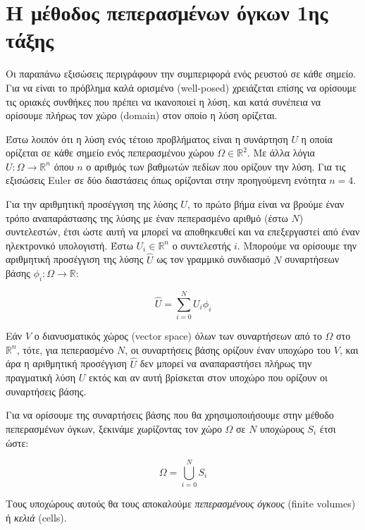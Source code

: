 \section{Η μέθοδος πεπερασμένων όγκων 1ης τάξης}

Οι παραπάνω εξισώσεις περιγράφουν την συμπεριφορά ενός ρευστού σε κάθε σημείο.
Για να είναι το πρόβλημα καλά ορισμένο (well-posed) χρειάζεται επίσης να ορίσουμε τις οριακές συνθήκες που πρέπει να ικανοποιεί η λύση, και κατά συνέπεια να ορίσουμε πλήρως τον χώρο (domain) στον οποίο η λύση ορίζεται.

Έστω λοιπόν ότι η λύση ενός τέτοιο προβλήματος είναι η συνάρτηση $U$ η οποία ορίζεται σε κάθε σημείο ενός πεπερασμένου χώρου $\Omega \in \mathbb{R}^2$.
Με άλλα λόγια $U : \Omega \rightarrow \mathbb{R}^n$ όπου $n$ ο αριθμός των βαθμωτών πεδίων που ορίζουν την λύση.
Για τις εξισώσεις Euler σε δύο διαστάσεις όπως ορίζονται στην προηγούμενη ενότητα $n = 4$.

Για την αριθμητική προσέγγιση της λύσης $U$, το πρώτο βήμα είναι να βρούμε έναν τρόπο αναπαράστασης της λύσης με έναν πεπερασμένο αριθμό (έστω $N$) συντελεστών, έτσι ώστε αυτή να μπορεί να αποθηκευθεί και να επεξεργαστεί από έναν ηλεκτρονικό υπολογιστή.
Έστω $U_i \in \mathbb{R}^n$ ο συντελεστής $i$.
Μπορούμε να ορίσουμε την αριθμητική προσέγγιση της λύσης $\hat{U}$ ως τον γραμμικό συνδιασμό $N$ συναρτήσεων βάσης $\phi_i : \Omega \rightarrow \mathbb{R}$:

\begin{equation}
    \hat{U} = \sum_{i = 0}^{N} U_i \phi_i
\end{equation}

Εάν $V$ ο διανυσματικός χώρος (vector space) όλων των συναρτήσεων από το $\Omega$ στο $\mathbb{R}^n$, τότε, για πεπερασμένο $N$, οι συναρτήσεις βάσης ορίζουν έναν υποχώρο του $V$, και άρα η αριθμητική προσέγγιση $\hat{U}$ δεν μπορεί να αναπαραστήσει πλήρως την πραγματική λύση $U$ εκτός και αν αυτή βρίσκεται στον υποχώρο που ορίζουν οι συναρτήσεις βάσης.

Για να ορίσουμε της συναρτήσεις βάσης που θα χρησιμοποιήσουμε στην μέθοδο πεπερασμένων όγκων, ξεκινάμε χωρίζοντας τον χώρο $\Omega$ σε $N$ υποχώρους $S_i$ έτσι ώστε:

\begin{equation}
    \Omega = \bigcup_{i = 0}^{N} S_i
\end{equation}

Τους υποχώρους αυτούς θα τους αποκαλούμε \emph{πεπερασμένους όγκους} (finite volumes) ή \emph{κελιά} (cells).

